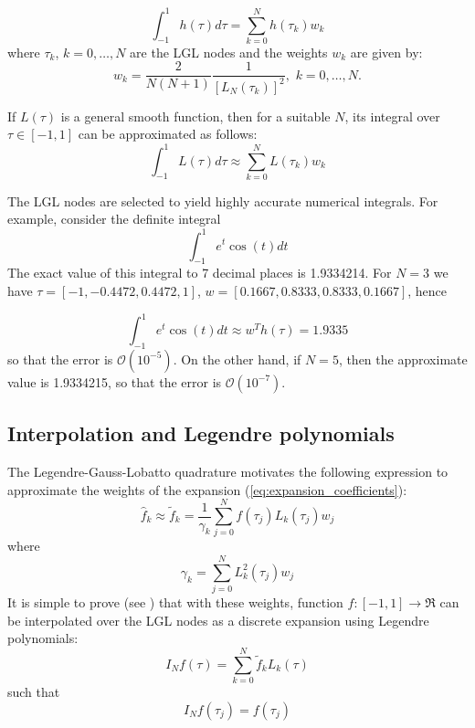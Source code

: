 \documentclass[a4paper,11pt]{report}    %
\begin{document}
\begin{equation}
 \int_{-1}^{1} h(\tau) d\tau = \sum\limits_{k=0}^N h(\tau_k) w_k
\end{equation}
where $\tau_k$, $k=0,\ldots,N$ are the LGL nodes and the weights $w_k$ are
given by:
\begin{equation} \label{quad_weights}
  w_k = \frac{2}{N(N+1)} \frac{1}{[L_N(\tau_k)]^2},\,\, k=0,\ldots,N.
\end{equation}

If $L(\tau)$ is a general smooth function, then for a suitable $N$, its  integral over $\tau\in[-1,1]$ can be approximated as follows:
\begin{equation}
 \int_{-1}^{1} L(\tau) d\tau \approx \sum\limits_{k=0}^N L(\tau_k) w_k
\end{equation}

The LGL nodes are selected to yield highly accurate numerical integrals.
For example, consider the definite integral 
\[\int_{-1}^1 e^t \cos(t) dt\]
The exact value of this integral to 7 decimal places is 1.9334214. 
For $N=3$ we have $\tau = [-1, -0.4472, 0.4472, 1]$, $w =[ 0.1667, 0.8333, 0.8333, 0.1667]$,
hence 

\[ \int_{-1}^1 e^t \cos(t) dt \approx w^T h(\tau) = 1.9335 \]
so that the error is $\mathcal{O}(10^{-5})$.
On the other hand, if $N=5$, then the approximate value is 1.9334215, so that the
error is $\mathcal{O}(10^{-7})$.




\subsection{Interpolation and Legendre polynomials}

The Legendre-Gauss-Lobatto quadrature motivates the following expression to approximate the weights
of the expansion (\ref{eq:expansion_coefficients}):
\[
  \hat f_k \approx \tilde f_k = \frac{1}{\gamma_k} \sum\limits_{j=0}^N f(\tau_j) L_k(\tau_j) w_j
\]
where
\[
   \gamma_k = \sum_{j=0}^N L_k^2(\tau_j) w_j
\]
It is simple to prove (see \cite{Hesthaven:07}) that with these weights, function $f : [-1,1]\rightarrow \Re$ 
can be interpolated over the LGL nodes as a discrete expansion using Legendre polynomials:
\begin{equation} \label{eq:Legendre_expansion}
    I_N f(\tau) = \sum\limits_{k=0}^N \tilde f_k L_k(\tau)
\end{equation}
such that
\begin{equation} \label{eq:colloc}
   I_N f(\tau_j) = f(\tau_j)
\end{equation}
\end{document}
